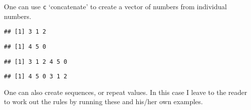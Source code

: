 \documentclass[paper=a4,10pt,div=17,headsepline,BCOR=12mm,twoside,open=right]{scrbook}\usepackage{knitr}
\begin{document}
One can use \texttt{c} `concatenate' to create a vector of numbers from individual numbers.

\begin{knitrout}\footnotesize
{}\color{fgcolor}\begin{kframe}
\begin{alltt}
 \hlkwb{<-} \hlstd{(}\hlstd{,}\hlstd{,}\hlstd{)}
\end{alltt}
\begin{verbatim}
## [1] 3 1 2
\end{verbatim}
\begin{alltt}
 \hlkwb{<-} \hlstd{(}\hlstd{,}\hlstd{,}\hlstd{)}
\end{alltt}
\begin{verbatim}
## [1] 4 5 0
\end{verbatim}
\begin{alltt}
 \hlkwb{<-} 
\end{alltt}
\begin{verbatim}
## [1] 3 1 2 4 5 0
\end{verbatim}
\begin{alltt}
 \hlkwb{<-} 
\end{alltt}
\begin{verbatim}
## [1] 4 5 0 3 1 2
\end{verbatim}
\end{kframe}
\end{knitrout}

One can also create sequences, or repeat values. In this case I leave to the reader to work out the rules by running these and his/her own examples.
\end{document}
